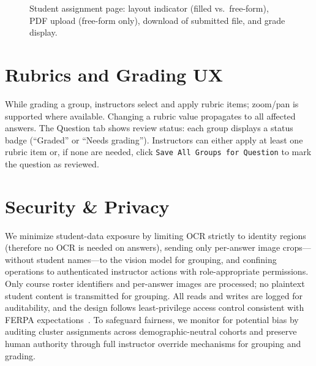 \documentclass[ms,twoside,print]{nuthesis}
\begin{document}
\begin{figure}[htb]
  \centering
  \caption{Student assignment page: layout indicator (filled vs.\ free-form), PDF upload (free-form only), download of submitted file, and grade display.}
  \label{fig:ui-student}
\end{figure}

\section{Rubrics and Grading UX}
While grading a group, instructors select and apply rubric items; zoom/pan is supported where available. Changing a rubric value propagates to all affected answers. The Question tab shows review status: each group displays a status badge (\enquote{Graded} or \enquote{Needs grading}). Instructors can either apply at least one rubric item or, if none are needed, click \texttt{Save All Groups for Question} to mark the question as reviewed.

\section{Security \& Privacy}
We minimize student-data exposure by limiting OCR strictly to identity regions (therefore no OCR is needed on answers), sending only per-answer image crops—without student names—to the vision model for grouping, and confining operations to authenticated instructor actions with role-appropriate permissions. Only course roster identifiers and per-answer images are processed; no plaintext student content is transmitted for grouping. All reads and writes are logged for auditability, and the design follows least-privilege access control consistent with FERPA expectations~\cite{FERPA1974}. To safeguard fairness, we monitor for potential bias by auditing cluster assignments across demographic-neutral cohorts and preserve human authority through full instructor override mechanisms for grouping and grading.
\end{document}
